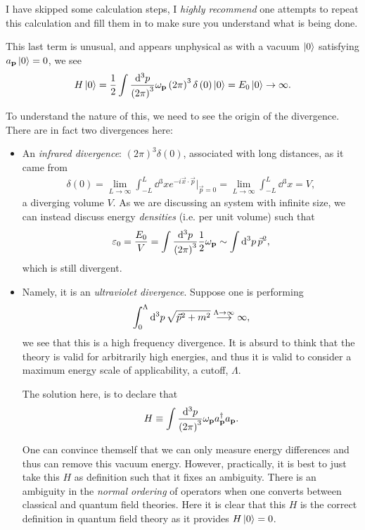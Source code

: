 I have skipped some calculation steps, I \textit{highly recommend} one attempts to repeat this calculation and fill them in to make sure you understand what is being done. 

This last term is unusual, and appears unphysical as with a vacuum $\ket{0}$ satisfying $a_{\vb{p}} \ket{0} = 0$, we see
\begin{align}
    H \ket{0} = \frac{1}{2}\int \frac{\dd{^3p}}{\left( 2\pi \right)^3} \omega_{\vb{p}} \left( 2\pi \right)^3 \delta \left( 0 \right) \ket{0} = E_0 \ket{0} \to \infty
.\end{align}

To understand the nature of this, we need to see the origin of the divergence. There are in fact two divergences here:
\begin{itemize}
    \item An \textit{infrared divergence}: $\left( 2\pi \right)^3 \delta \left( 0 \right) $, associated with long distances, as it came from
        \begin{align}
            \delta \left( 0 \right) = \lim_{L \to \infty} \int_{-L}^{L} \dd{^3x} e^{- i\vec{x}\cdot \vec{p}} \bigg|_{\vec{p}=0} = \lim_{L \to \infty} \int_{-L}^{L} \dd{^3x} = V
        ,\end{align}
        a diverging volume $V$. As we are discussing an system with infinite size, we can instead discuss energy \textit{densities} (i.e. per unit volume) such that
        \begin{align}
            \varepsilon_0 = \frac{E_0}{V} = \int \frac{\dd{^3p}}{\left( 2\pi \right)^3} \frac{1}{2}\omega_{\vb{p}} \sim  \int \dd{^3p} \vec{p}^2
        ,\end{align}
        which is still divergent. 
    \item Namely, it is an \textit{ultraviolet divergence}. Suppose one is performing
        \begin{align}
            \int_0^{\Lambda} \dd{^3p} \sqrt{\vec{p}^2 + m^2} \overset{\Lambda \to \infty}{\longrightarrow} \infty
        ,\end{align}
        we see that this is a high frequency divergence. It is absurd to think that the theory is valid for arbitrarily high energies, and thus it is valid to consider a maximum energy scale of applicability, a cutoff, $\Lambda$.

        The solution here, is to declare that
        \begin{align}
            H \equiv \int \frac{\dd{^3p}}{\left( 2\pi \right)^3} \omega_{\vb{p}} a_{\vb{p}}^{\dag} a_{\vb{p}}
        .\end{align}

        One can convince themself that we can only measure energy differences and thus can remove this vacuum energy. However, practically, it is best to just take this $H$ as definition such that it fixes an ambiguity. There is an ambiguity in the \textit{normal ordering} of operators when one converts between classical and quantum field theories. Here it is clear that this $H$ is the correct definition in quantum field theory as it provides $H \ket{0} = 0$.
\end{itemize}

